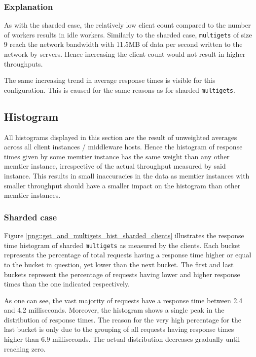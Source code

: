 \documentclass[11pt,a4paper]{article}
\begin{document}
\subsubsection{Explanation}
As with the sharded case, the relatively low client count compared to the number of workers results in idle workers. Similarly to the sharded case, \texttt{multigets} of size 9 reach the network bandwidth with 11.5MB of data per second written to the network by servers. Hence increasing the client count would not result in higher throughputs.

The same increasing trend in average response times is visible for this configuration. This is caused for the same reasons as for sharded \texttt{multigets}.

\subsection{Histogram}
All histograms displayed in this section are the result of unweighted averages across all client instances / middleware hosts. Hence the histogram of response times given by some memtier instance has the same weight than any other memtier instance, irrespective of the actual throughput measured by said instance. This results in small inaccuracies in the data as memtier instances with smaller throughput should have a smaller impact on the histogram than other memtier instances.

\subsubsection{Sharded case}
Figure \ref{png::get_and_multigets_hist_sharded_clients} illustrates the response time histogram of sharded \texttt{multigets} as measured by the clients. Each bucket represents the percentage of total requests having a response time higher or equal to the bucket in question, yet lower than the next bucket. The first and last buckets represent the percentage of requests having lower and higher response times than the one indicated respectively.

As one can see, the vast majority of requests have a response time between 2.4 and 4.2 milliseconds. Moreover, the histogram shows a single peak in the distribution of response times. The reason for the very high percentage for the last bucket is only due to the grouping of all requests having response times higher than 6.9 milliseconds. The actual distribution decreases gradually until reaching zero.
\end{document}
